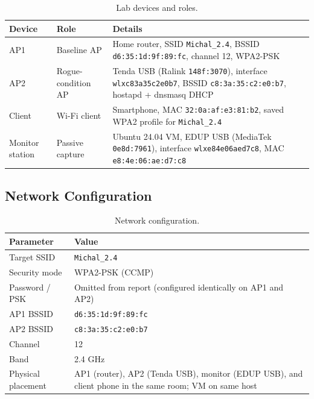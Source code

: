 \documentclass[12pt,a4paper]{article}
\begin{document}
\begin{table}[H]
\centering
\begin{tabular}{|p{3cm}|p{4cm}|p{6cm}|}
\hline
\textbf{Device} & \textbf{Role} & \textbf{Details} \\
\hline
AP1 & Baseline AP & Home router, SSID \texttt{Michal\_2.4}, BSSID \texttt{d6:35:1d:9f:89:fc}, channel 12, WPA2-PSK \\
\hline
AP2 & Rogue-condition AP & Tenda USB (Ralink \texttt{148f:3070}), interface \texttt{wlxc83a35c2e0b7}, BSSID \texttt{c8:3a:35:c2:e0:b7}, hostapd + dnsmasq DHCP \\
\hline
Client & Wi-Fi client & Smartphone, MAC \texttt{32:0a:af:e3:81:b2}, saved WPA2 profile for \texttt{Michal\_2.4} \\
\hline
Monitor station & Passive capture & Ubuntu 24.04 VM, EDUP USB (MediaTek \texttt{0e8d:7961}), interface \texttt{wlxe84e06aed7c8}, MAC \texttt{e8:4e:06:ae:d7:c8} \\
\hline
\end{tabular}
\caption{Lab devices and roles.}
\end{table}

\subsection{Network Configuration}

\begin{table}[H]
\centering
\begin{tabular}{|p{5cm}|p{8cm}|}
\hline
\textbf{Parameter} & \textbf{Value} \\
\hline
Target SSID & \texttt{Michal\_2.4} \\
\hline
Security mode & WPA2-PSK (CCMP) \\
\hline
Password / PSK & Omitted from report (configured identically on AP1 and AP2) \\
\hline
AP1 BSSID & \texttt{d6:35:1d:9f:89:fc} \\
\hline
AP2 BSSID & \texttt{c8:3a:35:c2:e0:b7} \\
\hline
Channel & 12 \\
\hline
Band & 2.4 GHz \\
\hline
Physical placement & AP1 (router), AP2 (Tenda USB), monitor (EDUP USB), and client phone in the same room; VM on same host \\
\hline
\end{tabular}
\caption{Network configuration.}
\end{table}
\end{document}
